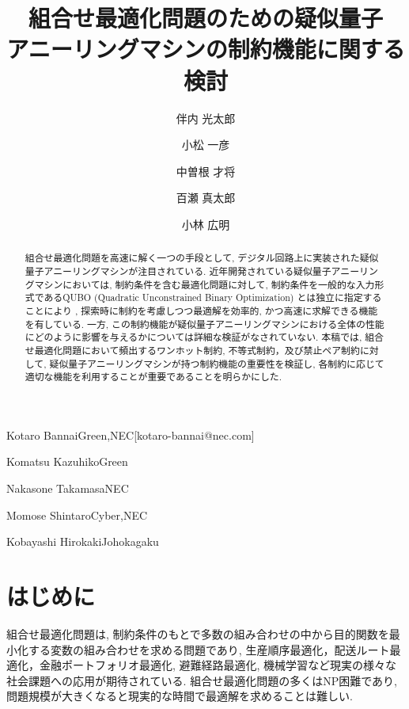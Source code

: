\documentclass[submit,techrep,noauthor]{ipsj}
\begin{document}
\title{組合せ最適化問題のための疑似量子\\アニーリングマシンの制約機能に関する検討}


\author{伴内 光太郎}{Kotaro Bannai}{Green,NEC}[kotaro-bannai@nec.com]
\author{小松 一彦}{Komatsu Kazuhiko}{Green}
\author{中曽根 才将}{Nakasone Takamasa}{NEC}
\author{百瀬 真太郎}{Momose Shintaro}{Cyber,NEC}
\author{小林 広明}{Kobayashi Hirokaki}{Johokagaku}

\begin{abstract}
組合せ最適化問題を高速に解く一つの手段として, デジタル回路上に実装された疑似量子アニーリングマシンが注目されている. 近年開発されている疑似量子アニーリングマシンにおいては, 制約条件を含む最適化問題に対して, 制約条件を一般的な入力形式であるQUBO (Quadratic Unconstrained Binary Optimization) とは独立に指定することにより
, 探索時に制約を考慮しつつ最適解を効率的, かつ高速に求解できる機能を有している. 一方, この制約機能が疑似量子アニーリングマシンにおける全体の性能にどのように影響を与えるかについては詳細な検証がなされていない. 本稿では, 組合せ最適化問題において頻出するワンホット制約, 不等式制約，及び禁止ペア制約に対して, 疑似量子アニーリングマシンが持つ制約機能の重要性を検証し, 各制約に応じて適切な機能を利用することが重要であることを明らかにした.
\end{abstract}

\maketitle

\section{はじめに}
組合せ最適化問題は, 制約条件のもとで多数の組み合わせの中から目的関数を最小化する変数の組み合わせを求める問題であり, 生産順序最適化\cite{jobshop}，配送ルート最適化\cite{isc-onoda}，金融ポートフォリオ最適化\cite{portfolio}, 避難経路最適化\cite{tsunami}, 機械学習\cite{ml}など現実の様々な社会課題への応用が期待されている. 組合せ最適化問題の多くはNP困難であり, 問題規模が大きくなると現実的な時間で最適解を求めることは難しい. 
\end{document}
